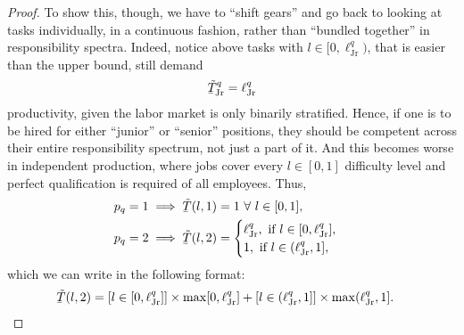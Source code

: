 \documentclass[hidelinks, nonatbib]{elsarticle}
\begin{document}
\begin{lemma}
\begin{proof}
        To show this, though, we have to ``shift gears'' and go back to looking at tasks individually, in a continuous fashion, rather than ``bundled together'' in responsibility spectra. Indeed, notice above tasks with $l \in [0, \ell_{\text{Jr}}^{q})$, that is easier than the upper bound, still demand
        \begin{gather}
            \underaccent{\bar}{\tilde{T}}_{\text{Jr}}^{q}
            =
            \ell_{\text{Jr}}^{q}
        \end{gather}
        productivity, given the labor market is only binarily stratified. Hence, if one is to be hired for either ``junior'' or ``senior'' positions, they should be competent across their entire responsibility spectrum, not just a part of it. And this becomes worse in independent production, where jobs cover every $l \in [0,1]$ difficulty level and perfect qualification is required of all employees. Thus, 
        \begin{align}
            p_q = 1
            &\implies
            \underaccent{\bar}{\tilde{T}}(l, 1)
            = 1
            \
            \forall
            \
            l \in [0,1]
            ,
            \\
            p_q = 2
            &\implies
            \underaccent{\bar}{\tilde{T}}(l, 2)
            = 
            \begin{cases}
                \ell_{\text{Jr}}^{q}, \text{ if } l \in [0, \ell_{\text{Jr}}^{q}],
                \\
                1, \text{ if } l \in (\ell_{\text{Jr}}^{q}, 1],
            \end{cases}
        \end{align}
        which we can write in the following format:
        \begin{align}
            \underaccent{\bar}{\tilde{T}}(l, 2)
            &= 
            [l \in [0, \ell_{\text{Jr}}^{q}]]
            \times
            \max[0, \ell_{\text{Jr}}^{q}]
            +
            [l \in (\ell_{\text{Jr}}^{q}, 1]]
            \times
            \max(\ell_{\text{Jr}}^{q}, 1]
            .
        \end{align}


\end{proof}
\end{lemma}
\end{document}
